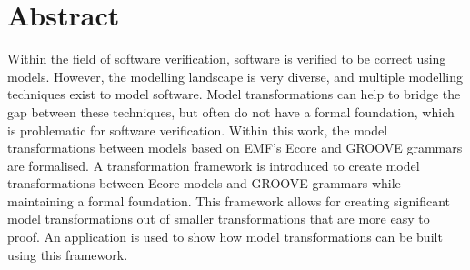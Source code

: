 \chapter*{Abstract}
\label{chapter:abstract}
Within the field of software verification, software is verified to be correct using models. However, the modelling landscape is very diverse, and multiple modelling techniques exist to model software. Model transformations can help to bridge the gap between these techniques, but often do not have a formal foundation, which is problematic for software verification. Within this work, the model transformations between models based on EMF's Ecore and GROOVE grammars are formalised. A transformation framework is introduced to create model transformations between Ecore models and GROOVE grammars while maintaining a formal foundation. This framework allows for creating significant model transformations out of smaller transformations that are more easy to proof. An application is used to show how model transformations can be built using this framework.